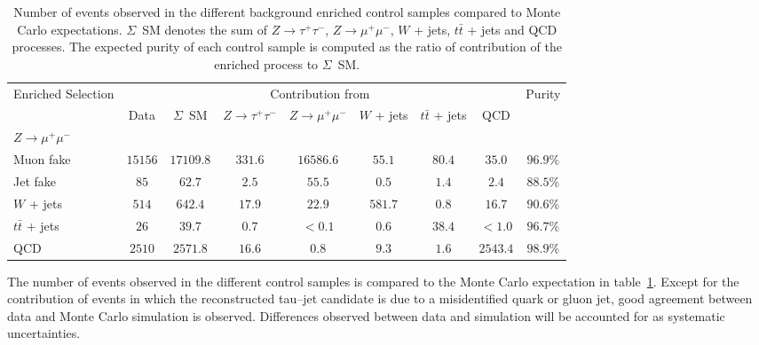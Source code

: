 \begin{table}[t]
\begin{center}
\tablesize
\begin{tabular}{|l|c|c|c|c|c|c|c|c|}
\hline
\multirow{2}{17mm}{Enriched Selection} & \multicolumn{7}{c|}{Contribution from} & \multirow{2}{12mm}{Purity} \\
 & Data & $\Sigma$~SM & $Z \to \tau^{+} \tau^{-}$ & $Z \to \mu^{+} \mu^{-}$ & $W$ + jets & $t\bar{t}$ + jets & QCD & \\
\hline
\hline
$Z \to \mu^{+} \mu^{-}$ & & & & & & & & \\
\hspace{2mm} Muon fake & $15156$ & $17109.8$ & $331.6$ & $16586.6$ & $55.1$ & $80.4$ & $35.0$ & $96.9\%$ \\
\hspace{2mm} Jet fake & $85$ & $62.7$ & $2.5$ & $55.5$ & $0.5$ & $1.4$ & $2.4$ & $88.5\%$ \\
$W$ + jets & $514$ & $642.4$ & $17.9$ & $22.9$ & $581.7$ & $0.8$ & $16.7$ & $90.6\%$ \\  
$t\bar{t}$ + jets & $26$ & $39.7$ & $0.7$ & $< 0.1$ & $0.6$ & $38.4$ & $< 1.0$ & $96.7\%$ \\
QCD & $2510$ & $2571.8$ & $16.6$ & $0.8$ & $9.3$ & $1.6$ & $2543.4$ & $98.9\%$ \\
\hline
\end{tabular}
\caption[Comparison of background control region yields in data and the
prediction from simulation]{\captiontext 
         Number of events observed in the different background enriched control
         samples compared to Monte Carlo expectations.  $\Sigma$~SM denotes the
         sum of $Z \to \tau^{+} \tau^{-}$, $Z \to \mu^{+} \mu^{-}$, $W$ + jets,
         $t\bar{t}$ + jets and QCD processes.  The expected purity of each
         control sample is computed as the ratio of contribution of the enriched
         process to $\Sigma$~SM.}
\label{tab:ResultsMuTauBgControlRegions}
\end{center}
\end{table}

The number of events observed in the different control samples is compared to
the Monte Carlo expectation in table~\ref{tab:ResultsMuTauBgControlRegions}.
Except for the contribution of \ZMM events in which the
reconstructed tau--jet candidate is due to a misidentified quark or gluon jet,
good agreement between data and Monte Carlo simulation is observed.  Differences
observed between data and simulation will be accounted for as systematic
uncertainties.

